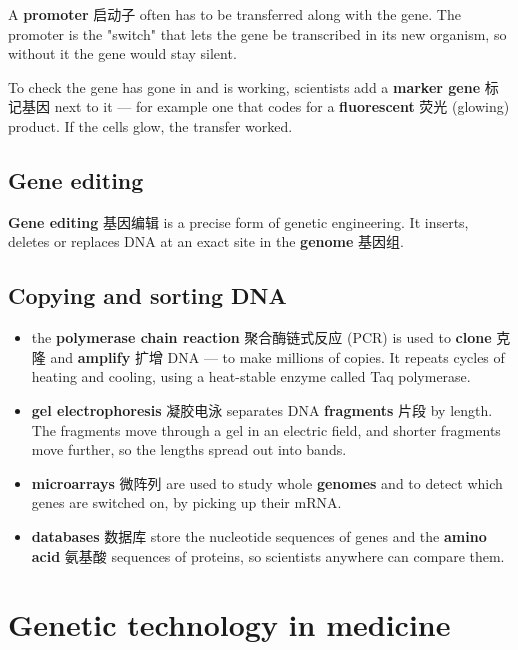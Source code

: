 \documentclass[11pt]{article}
\begin{document}
A \textbf{promoter} 启动子 often has to be transferred along with the gene. The promoter is the "switch" that lets the gene be transcribed in its new organism, so without it the gene would stay silent.

To check the gene has gone in and is working, scientists add a \textbf{marker gene} 标记基因 next to it — for example one that codes for a \textbf{fluorescent} 荧光 (glowing) product. If the cells glow, the transfer worked.

\subsection*{Gene editing}

\textbf{Gene editing} 基因编辑 is a precise form of genetic engineering. It inserts, deletes or replaces DNA at an exact site in the \textbf{genome} 基因组.

\subsection*{Copying and sorting DNA}

\begin{itemize}
\item the \textbf{polymerase chain reaction} 聚合酶链式反应 (PCR) is used to \textbf{clone} 克隆 and \textbf{amplify} 扩增 DNA — to make millions of copies. It repeats cycles of heating and cooling, using a heat-stable enzyme called Taq polymerase.

\item \textbf{gel electrophoresis} 凝胶电泳 separates DNA \textbf{fragments} 片段 by length. The fragments move through a gel in an electric field, and shorter fragments move further, so the lengths spread out into bands.

\item \textbf{microarrays} 微阵列 are used to study whole \textbf{genomes} and to detect which genes are switched on, by picking up their mRNA.

\item \textbf{databases} 数据库 store the nucleotide sequences of genes and the \textbf{amino acid} 氨基酸 sequences of proteins, so scientists anywhere can compare them.

\end{itemize}

\section*{Genetic technology in medicine}
\end{document}
